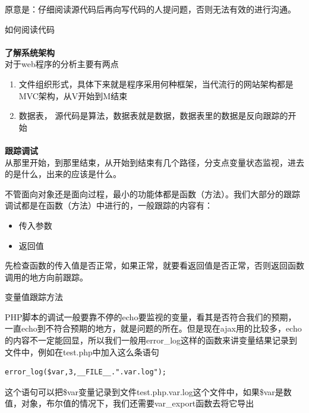 \documentclass{article}
\begin{document}

原意是：仔细阅读源代码后再向写代码的人提问题，否则无法有效的进行沟通。

如何阅读代码

\paragraph{}\textbf{了解系统架构}\\

对于web程序的分析主要有两点

\begin{enumerate}
\item 文件组织形式，具体下来就是程序采用何种框架，当代流行的网站架构都是MVC架构，从V开始到M结束
\item 数据表， 源代码是算法，数据表就是数据，数据表里的数据是反向跟踪的开始
\end{enumerate}

\paragraph{}\textbf{跟踪调试}\\

从那里开始，到那里结束，从开始到结束有几个路径，分支点变量状态监视，进去的是什么，出来的应该是什么。

不管面向对象还是面向过程，最小的功能体都是函数（方法）。我们大部分的跟踪调试都是在函数（方法）中进行的，一般跟踪的内容有：

\begin{itemize}
\item 传入参数
\item 返回值
\end{itemize}

先检查函数的传入值是否正常，如果正常，就要看返回值是否正常，否则返回函数调用的地方向前跟踪。

变量值跟踪方法

PHP脚本的调试一般要靠不停的echo要监视的变量，看其是否符合我们的预期，一直echo到不符合预期的地方，就是问题的所在。但是现在ajax用的比较多，echo的内容不一定能回显，所以我们一般用error\_log这样的函数来讲变量结果记录到文件中，例如在test.php中加入这么条语句

\begin{verbatim}
error_log($var,3,__FILE__.".var.log");
\end{verbatim}
这个语句可以把\$var变量记录到文件test.php.var.log这个文件中，如果\$var是数值，对象，布尔值的情况下，我们还需要var\_export函数去将它导出
\end{document}
